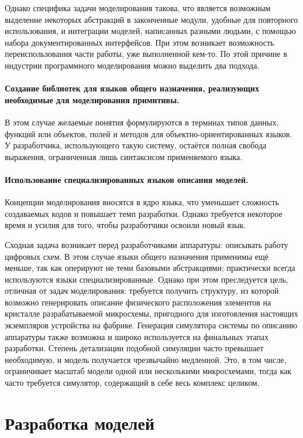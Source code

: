 Однако специфика задачи моделирования такова, что является возможным выделение некоторых абстракций в законченные модули, удобные для повторного использования, и интеграции моделей, написанных разными людьми, с помощью набора документированных интерфейсов. При этом возникает возможность переиспользования части работы, уже выполненной кем-то. По этой причине в индустрии программного моделирования можно выделить два подхода.

\paragraph{Создание библиотек для языков общего назначения, реализующих необходимые для  моделирования примитивы.} В этом случае желаемые понятия формулируются в терминах типов данных, функций или объектов, полей и методов для объектно-ориентированных языков. У разработчика, использующего такую систему, остаётся полная свобода выражения, ограниченная лишь синтаксисом применяемого языка.
\paragraph{Использование специализированных языков описания моделей.} Концепции моделирования вносятся в ядро языка, что уменьшает сложность создаваемых кодов и повышает темп разработки. Однако требуется некоторое время и усилия для того, чтобы разработчики освоили новый язык.

Сходная задача возникает перед разработчиками аппаратуры: описывать работу цифровых схем. В этом случае языки общего назначения применимы ещё меньше, так как оперируют не теми базовыми абстракциями; практически всегда используются языки специализированные. Однако при этом преследуется цель, отличная от задач моделирования: требуется получить структуру, из которой возможно генерировать описание физического расположения элементов на кристалле разрабатываемой микросхемы, пригодного для изготовления настоящих экземпляров устройства на фабрике. Генерация симулятора системы по описанию аппаратуры также возможна и широко используется на финальных этапах разработки. Степень детализации подобной симуляции часто превышает необходимую, и модель получается чрезвычайно медленной. Это, в том числе, ограничивает масштаб модели одной или несколькими микросхемами, тогда как часто требуется симулятор, содержащий в себе весь комплекс целиком.

\section{Разработка моделей}

